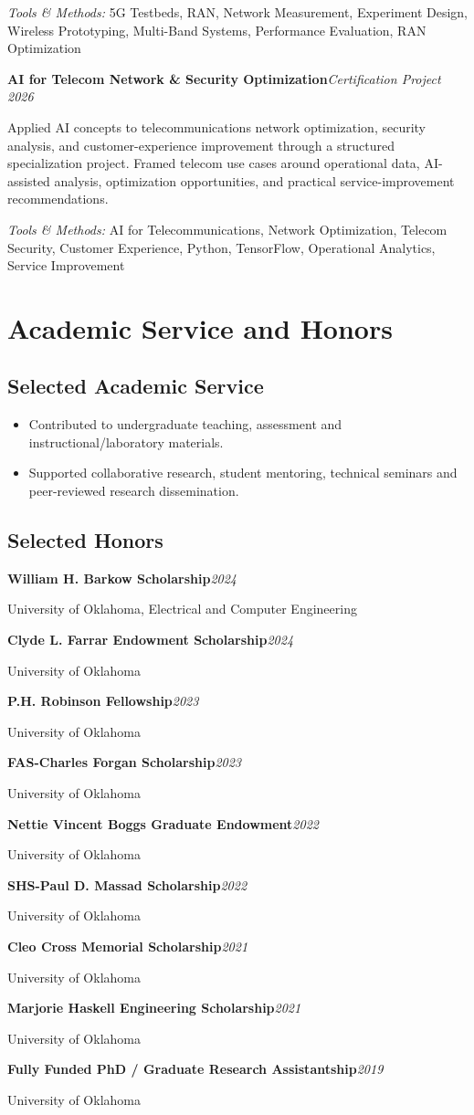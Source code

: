 \documentclass[9pt,letterpaper]{extarticle}
\newcommand{\entry}[2]{\Needspace{4\baselineskip}\textbf{#1}\hfill\textit{#2}\par}
\begin{document}
{\small\textit{Tools \& Methods:} 5G Testbeds, RAN, Network Measurement, Experiment Design, Wireless Prototyping, Multi-Band Systems, Performance Evaluation, RAN Optimization\par}
\vspace{1pt}
\entry{AI for Telecom Network \& Security Optimization}{Certification Project \textbar{} 2026}
Applied AI concepts to telecommunications network optimization, security analysis, and customer-experience improvement through a structured specialization project. Framed telecom use cases around operational data, AI-assisted analysis, optimization opportunities, and practical service-improvement recommendations.\par
{\small\textit{Tools \& Methods:} AI for Telecommunications, Network Optimization, Telecom Security, Customer Experience, Python, TensorFlow, Operational Analytics, Service Improvement\par}
\vspace{1pt}
\section{Academic Service and Honors}
\subsection{Selected Academic Service}
\begin{itemize}
\item Contributed to undergraduate teaching, assessment and instructional/laboratory materials.
\item Supported collaborative research, student mentoring, technical seminars and peer-reviewed research dissemination.
\end{itemize}
\subsection{Selected Honors}
\entry{William H. Barkow Scholarship}{2024}
{\small University of Oklahoma, Electrical and Computer Engineering\par}
\entry{Clyde L. Farrar Endowment Scholarship}{2024}
{\small University of Oklahoma\par}
\entry{P.H. Robinson Fellowship}{2023}
{\small University of Oklahoma\par}
\entry{FAS-Charles Forgan Scholarship}{2023}
{\small University of Oklahoma\par}
\entry{Nettie Vincent Boggs Graduate Endowment}{2022}
{\small University of Oklahoma\par}
\entry{SHS-Paul D. Massad Scholarship}{2022}
{\small University of Oklahoma\par}
\entry{Cleo Cross Memorial Scholarship}{2021}
{\small University of Oklahoma\par}
\entry{Marjorie Haskell Engineering Scholarship}{2021}
{\small University of Oklahoma\par}
\entry{Fully Funded PhD / Graduate Research Assistantship}{2019}
{\small University of Oklahoma\par}
\end{document}
